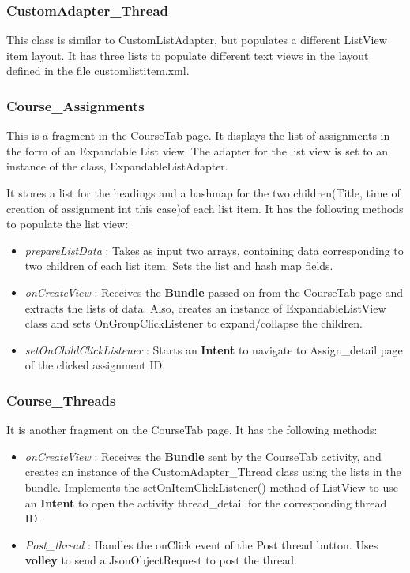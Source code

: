 \documentclass{article}
\begin{document}
\subsubsection{CustomAdapter\_Thread}
\par\noindent This class is similar to CustomListAdapter, but populates a different ListView item layout. It has three lists to populate different text views in the layout defined in the file customlistitem.xml.

\subsubsection{Course\_Assignments}
\par\noindent This is a fragment in the CourseTab page. It displays the list of assignments in the form of an Expandable List view. The adapter for the list view is set to an instance of the class, ExpandableListAdapter. 
\par\noindent It stores a list for the headings and a hashmap for the two children(Title, time of creation of assignment int this case)of each list item.
It has the following methods to populate the list view:
\begin{itemize}
\item \textit{prepareListData} : Takes as input two arrays, containing data corresponding to two children of each list item. Sets the list and hash map fields.
\item \textit{onCreateView} : Receives the \textbf{Bundle} passed on from the CourseTab page and extracts the lists of data. Also, creates an instance of ExpandableListView class and sets OnGroupClickListener to expand/collapse the children.
\item \textit{setOnChildClickListener} : Starts an \textbf{Intent} to navigate to Assign\_detail page of the clicked assignment ID.
\end{itemize}

\subsubsection{Course\_Threads}
\par\noindent It is another fragment on the CourseTab page. It has the following methods:
\begin{itemize}
\item \textit{onCreateView} : Receives the \textbf{Bundle} sent by the CourseTab activity, and creates an instance of the CustomAdapter\_Thread class using the lists in the bundle. Implements the setOnItemClickListener() method of ListView to use an \textbf{Intent} to open the activity thread\_detail for the corresponding thread ID.

\item \textit{Post\_thread} :  Handles the onClick event of the Post thread button. Uses \textbf{volley} to send a JsonObjectRequest to post the thread.
\end{itemize}
\end{document}
